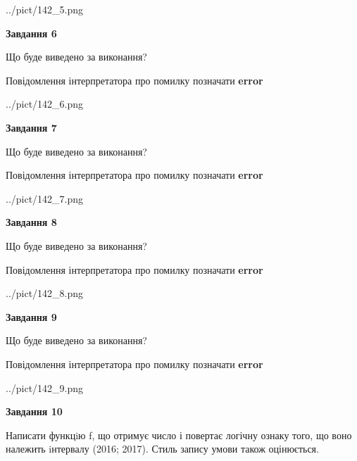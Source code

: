 \documentclass[12pt, ukrainian]{article}
\begin{document}
{\begin {large}
\begin{center}
	{../pict/142_5.png}
\end{center}
\newpage

{\begin {center}\textbf{Завдання 6}\end {center}}\par
Що буде виведено за виконання? \par
Повідомлення інтерпретатора про помилку позначати \textbf{error}

\begin{center}
	{../pict/142_6.png}
\end{center}
\newpage

{\begin {center}\textbf{Завдання 7}\end {center}}\par
Що буде виведено за виконання? \par
Повідомлення інтерпретатора про помилку позначати \textbf{error}

\begin{center}
	{../pict/142_7.png}
\end{center}
\newpage

{\begin {center}\textbf{Завдання 8}\end {center}}\par
Що буде виведено за виконання? \par
Повідомлення інтерпретатора про помилку позначати \textbf{error}

\begin{center}
	{../pict/142_8.png}
\end{center}
\newpage

{\begin {center}\textbf{Завдання 9}\end {center}}\par
Що буде виведено за виконання? \par
Повідомлення інтерпретатора про помилку позначати \textbf{error}

\begin{center}
	{../pict/142_9.png}
\end{center}
\newpage

{\begin {center}\textbf{Завдання 10}\end {center}}\par

Написати функцiю f, що отримує число і повертає логічну ознаку того, що воно належить iнтервалу (2016; 2017). Стиль запису умови також оцінюється.\par
\newpage

\end {large}}
\end{document}
